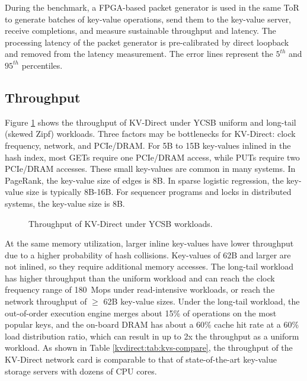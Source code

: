 During the benchmark, a FPGA-based packet generator \cite{li2016clicknp} is used in the same ToR to generate batches of key-value operations, send them to the key-value server, receive completions, and measure sustainable throughput and latency. The processing latency of the packet generator is pre-calibrated by direct loopback and removed from the latency measurement. The error lines represent the $5^{th}$ and $95^{th}$ percentiles.

\subsection{Throughput}

Figure \ref{kvdirect:fig:ycsb-tput} shows the throughput of KV-Direct under YCSB uniform and long-tail (skewed Zipf) workloads. Three factors may be bottlenecks for KV-Direct: clock frequency, network, and PCIe/DRAM. For 5B to 15B key-values inlined in the hash index, most GETs require one PCIe/DRAM access, while PUTs require two PCIe/DRAM accesses. These small key-values are common in many systems. In PageRank, the key-value size of edges is 8B. In sparse logistic regression, the key-value size is typically 8B-16B. For sequencer programs and locks in distributed systems, the key-value size is 8B.

\begin{figure}[htbp]
	\centering
	\caption{Throughput of KV-Direct under YCSB workloads.}
	\label{kvdirect:fig:ycsb-tput}
\end{figure}

At the same memory utilization, larger inline key-values have lower throughput due to a higher probability of hash collisions. Key-values of 62B and larger are not inlined, so they require additional memory accesses. The long-tail workload has higher throughput than the uniform workload and can reach the clock frequency range of 180~Mops under read-intensive workloads, or reach the network throughput of $\geq$ 62B key-value sizes. Under the long-tail workload, the out-of-order execution engine merges about 15\% of operations on the most popular keys, and the on-board DRAM has about a 60\% cache hit rate at a 60\% load distribution ratio, which can result in up to 2x the throughput as a uniform workload. As shown in Table \ref{kvdirect:tab:kvs-compare}, the throughput of the KV-Direct network card is comparable to that of state-of-the-art key-value storage servers with dozens of CPU cores.

